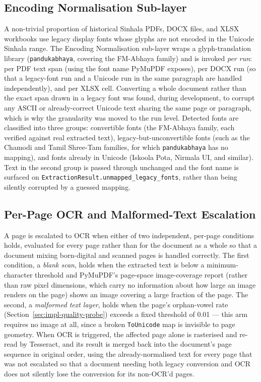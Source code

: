 \documentclass[12pt,a4paper,oneside]{report}
\begin{document}
\subsection{Encoding Normalisation Sub-layer}
\label{sec:impl-encoding}
A non-trivial proportion of historical Sinhala PDFs, DOCX files, and XLSX workbooks use legacy display fonts whose glyphs are not encoded in the Unicode Sinhala range. The Encoding Normalisation sub-layer wraps a glyph-translation library (\texttt{pandukabhaya}, covering the FM-Abhaya family) and is invoked \textit{per run}: per PDF text span (using the font name PyMuPDF exposes), per DOCX run (so that a legacy-font run and a Unicode run in the same paragraph are handled independently), and per XLSX cell. Converting a whole document rather than the exact span drawn in a legacy font was found, during development, to corrupt any ASCII or already-correct Unicode text sharing the same page or paragraph, which is why the granularity was moved to the run level. Detected fonts are classified into three groups: convertible fonts (the FM-Abhaya family, each verified against real extracted text), legacy-but-unconvertible fonts (such as the Chamodi and Tamil Shree-Tam families, for which \texttt{pandukabhaya} has no mapping), and fonts already in Unicode (Iskoola Pota, Nirmala UI, and similar). Text in the second group is passed through unchanged and the font name is surfaced on \texttt{ExtractionResult.unmapped\_legacy\_fonts}, rather than being silently corrupted by a guessed mapping.

\subsection{Per-Page OCR and Malformed-Text Escalation}
\label{sec:impl-ocr-decision}
A page is escalated to OCR when either of two independent, per-page conditions holds, evaluated for every page rather than for the document as a whole so that a document mixing born-digital and scanned pages is handled correctly. The first condition, a \textit{blank scan}, holds when the extracted text is below a minimum-character threshold and PyMuPDF's page-space image-coverage report (rather than raw pixel dimensions, which carry no information about how large an image renders on the page) shows an image covering a large fraction of the page. The second, a \textit{malformed text layer}, holds when the page's orphan-vowel rate (Section~\ref{sec:impl-quality-probe}) exceeds a fixed threshold of 0.01 — this arm requires no image at all, since a broken \texttt{ToUnicode} map is invisible to page geometry. When OCR is triggered, the affected page alone is rasterised and re-read by Tesseract, and its result is merged back into the document's page sequence in original order, using the already-normalised text for every page that was not escalated so that a document needing both legacy conversion and OCR does not silently lose the conversion for its non-OCR'd pages.
\end{document}
